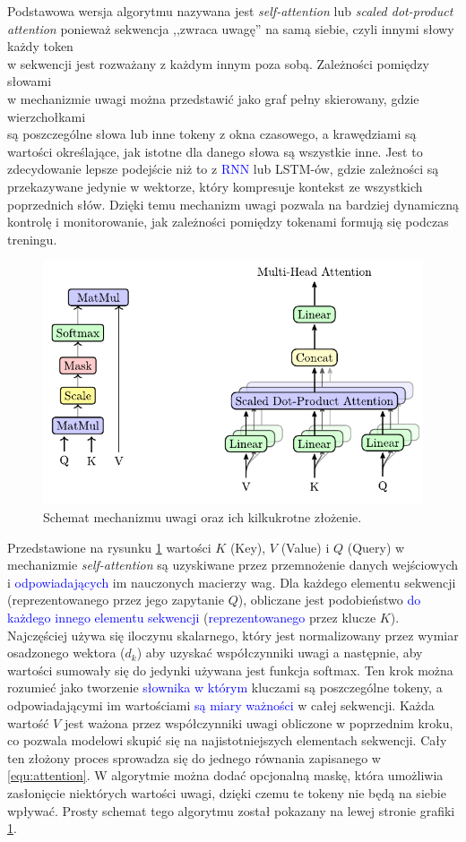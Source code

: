 \documentclass[data-science]{agh-wi} %
\begin{document}
Podstawowa wersja algorytmu nazywana jest \textit{self-attention} lub \textit{scaled dot-product attention} ponieważ sekwencja ,,zwraca uwagę'' na samą siebie, czyli innymi słowy każdy token\\  w sekwencji jest rozważany z każdym innym poza sobą. Zależności pomiędzy słowami\\ w mechanizmie uwagi można przedstawić jako graf pełny skierowany, gdzie wierzchołkami\\ są poszczególne słowa lub inne tokeny z okna czasowego, a krawędziami są wartości określające, jak istotne dla danego słowa są wszystkie inne. Jest to zdecydowanie lepsze podejście niż to z \textcolor{blue}{RNN} lub LSTM-ów, gdzie zależności są przekazywane jedynie w wektorze, który kompresuje kontekst ze wszystkich poprzednich słów. Dzięki temu mechanizm uwagi pozwala na bardziej dynamiczną kontrolę i monitorowanie, jak zależności pomiędzy tokenami formują się podczas treningu.


\begin{figure}[ht!]
    \centering
    \includegraphics[width=0.7\linewidth]{./img/attention_heads.pdf}
    \caption{Schemat mechanizmu uwagi oraz ich kilkukrotne złożenie.}\label{fig:attention_heads}
\end{figure}

Przedstawione na rysunku \ref*{fig:attention_heads} wartości $K$ (Key), $V$ (Value) i $Q$ (Query) w mechanizmie \textit{self-attention} są uzyskiwane przez przemnożenie danych wejściowych i \textcolor{blue}{odpowiadających} im nauczonych macierzy wag. Dla każdego elementu sekwencji (reprezentowanego przez jego zapytanie $Q$), obliczane jest podobieństwo \textcolor{blue}{do każdego innego elementu sekwencji} (\textcolor{blue}{reprezentowanego} przez klucze $K$). Najczęściej używa się iloczynu skalarnego, który jest normalizowany przez wymiar osadzonego wektora ($d_k$) aby uzyskać współczynniki uwagi a następnie, aby wartości sumowały się do jedynki używana jest funkcja softmax. Ten krok można rozumieć jako tworzenie \textcolor{blue}{słownika w którym} kluczami są poszczególne tokeny, a odpowiadającymi im wartościami \textcolor{blue}{są miary ważności} w całej sekwencji. Każda wartość $V$ jest ważona przez współczynniki uwagi obliczone w poprzednim kroku, co pozwala modelowi skupić się na najistotniejszych elementach sekwencji. Cały ten złożony proces sprowadza się do jednego równania zapisanego w \ref*{equ:attention}. W algorytmie można dodać opcjonalną maskę, która umożliwia zasłonięcie niektórych wartości uwagi, dzięki czemu te tokeny nie będą na siebie wpływać. Prosty schemat tego algorytmu został pokazany na lewej stronie grafiki \ref*{fig:attention_heads}.
\end{document}
